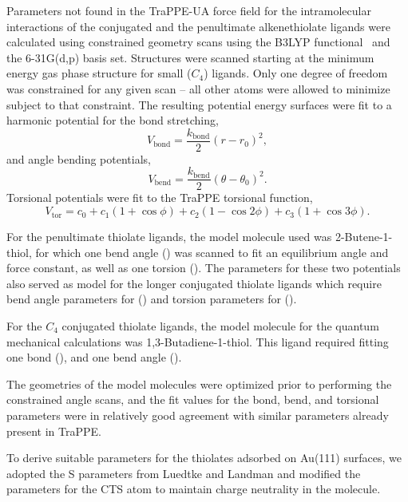 Parameters not found in the TraPPE-UA force field for the
intramolecular interactions of the conjugated and the penultimate
alkenethiolate ligands were calculated using constrained geometry
scans using the B3LYP functional~\cite{Becke:1993kq,Lee:1988qf} and
the 6-31G(d,p) basis set. Structures were scanned starting at the
minimum energy gas phase structure for small ($C_4$) ligands.  Only
one degree of freedom was constrained for any given scan -- all other
atoms were allowed to minimize subject to that constraint.  The
resulting potential energy surfaces were fit to a harmonic potential
for the bond stretching,
\begin{equation}
V_\mathrm{bond} = \frac{k_\mathrm{bond}}{2} \left( r - r_0 \right)^2,
\end{equation}
and angle bending potentials,
\begin{equation}
V_\mathrm{bend} = \frac{k_\mathrm{bend}}{2} \left(\theta - \theta_0\right)^2.
\end{equation}
Torsional potentials were fit to the TraPPE torsional function,
\begin{equation}
V_\mathrm{tor} = c_0 + c_1  \left(1 + \cos\phi \right) + c_2  \left(1 - \cos 2\phi \right) + c_3  \left(1 + \cos 3 \phi \right).
\end{equation}

For the penultimate thiolate ligands, the model molecule used was
2-Butene-1-thiol, for which one bend angle () was
scanned to fit an equilibrium angle and force constant, as well as one
torsion ().  The parameters for these two
potentials also served as model for the longer conjugated thiolate
ligands which require bend angle parameters for () and
torsion parameters for ().

For the $C_4$ conjugated thiolate ligands, the model molecule for the
quantum mechanical calculations was 1,3-Butadiene-1-thiol.  This
ligand required fitting one bond (), and one bend angle
().

The geometries of the model molecules were optimized prior to
performing the constrained angle scans, and the fit values for the
bond, bend, and torsional parameters were in relatively good agreement
with similar parameters already present in TraPPE.

To derive suitable parameters for the thiolates adsorbed on Au(111)
surfaces, we adopted the S parameters from Luedtke and
Landman\cite{landman:1998} and modified the parameters for the CTS
atom to maintain charge neutrality in the molecule.

